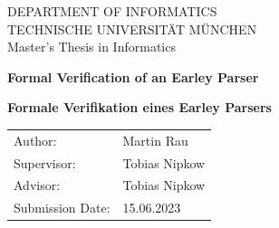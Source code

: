 \documentclass[headsepline,footsepline,footinclude=false,oneside,fontsize=11pt,paper=a4,listof=totoc,bibliography=totoc]{scrbook} %
\newcommand*{\getUniversity}{Technische Universität München}
\newcommand*{\getFaculty}{Department of Informatics}
\newcommand*{\getTitle}{Formal Verification of an Earley Parser}
\newcommand*{\getTitleGer}{Formale Verifikation eines Earley Parsers}
\newcommand*{\getAuthor}{Martin Rau}
\newcommand*{\getDoctype}{Master's Thesis in Informatics}
\newcommand*{\getSupervisor}{Tobias Nipkow}
\newcommand*{\getAdvisor}{Tobias Nipkow}
\newcommand*{\getSubmissionDate}{15.06.2023}
\begin{document}
\frontmatter{}


%
\begin{titlepage}
  \centering


  \vspace{5mm}
  {\huge\MakeUppercase{\getFaculty{}}}\\

  \vspace{5mm}
  {\large\MakeUppercase{\getUniversity{}}}\\

  \vspace{20mm}
  {\Large \getDoctype{}}

  \vspace{15mm}
  {\huge\bfseries \getTitle{} \par}

  \vspace{10mm}
  {\huge\bfseries \foreignlanguage{ngerman}{\getTitleGer{}} \par}

  \vspace{15mm}
  \begin{tabular}{l l}
    Author:          & \getAuthor{} \\
    Supervisor:      & \getSupervisor{} \\
    Advisor:         & \getAdvisor{} \\
    Submission Date: & \getSubmissionDate{} \\
  \end{tabular}

\end{titlepage}
\end{document}
